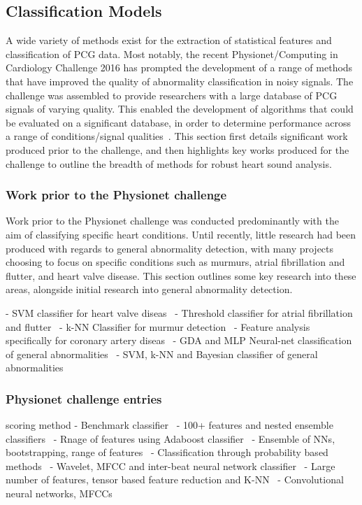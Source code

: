 \documentclass[titlepage, 12pt]{scrartcl} \usepackage{enumitem}
\begin{document}
\doublespacing

\subsection{Classification Models}

A wide variety of methods exist for the extraction of statistical features and
classification of PCG data. Most notably, the recent Physionet/Computing in
Cardiology Challenge 2016 has prompted the development of a range of methods
that have improved the quality of abnormality classification in noisy signals.
The challenge was assembled to provide researchers with a large database of PCG
signals of varying quality. This enabled the development of algorithms that
could be evaluated on a significant database, in order to determine performance
across a range of conditions/signal qualities~\parencite{Clifford2016}. This
section first details significant work produced prior to the challenge, and
then highlights key works produced for the challenge to outline the breadth of
methods for robust heart sound analysis.

\subsubsection{Work prior to the Physionet challenge}
Work prior to the Physionet challenge was conducted predominantly with the aim
of classifying specific heart conditions. Until recently, little research had
been produced with regards to general abnormality detection, with many projects
choosing to focus on specific conditions such as murmurs, atrial fibrillation
and flutter, and heart valve disease. This section outlines some key research
into these areas, alongside initial research into general abnormality
detection.

- SVM classifier for heart valve diseas~\parencite{Maglogiannis2009}
- Threshold classifier for atrial fibrillation and flutter~\parencite{Dash2009}
- k-NN Classifier for murmur detection~\parencite{Quiceno-Manrique2010a}
- Feature analysis specifically for coronary artery
diseas~\parencite{Schmidt2015}
- GDA and MLP Neural-net classification of general abnormalities~\parencite{Yaghouby2009}
- SVM, k-NN and Bayesian classifier of general abnormalities~\parencite{Lubaib2016}

\subsubsection{Physionet challenge entries}
scoring method
- Benchmark classifier~\parencite{Liu2016}
- 100+ features and nested ensemble classifiers~\parencite{Homsi2016}
- Rnage of features using Adaboost classifier~\parencite{Potes2016}
- Ensemble of NNs, bootstrapping, range of features~\parencite{Zabihi2016}
- Classification through probability based methods~\parencite{Plesinger2017}
- Wavelet, MFCC and inter-beat neural network classifier~\parencite{Kay2017}
- Large number of features, tensor based feature reduction and
K-NN~\parencite{Bobillo2016}
- Convolutional neural networks, MFCCs~\parencite{Rubin2016}
\end{document}
